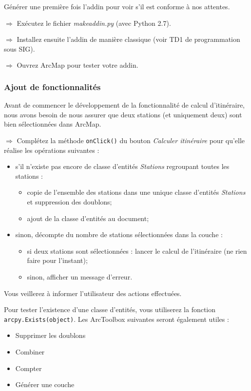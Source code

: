 \documentclass[11pt]{article}
\newcommand{\action}{$\Rightarrow$ }
\newcommand{\code}[1]{\lstinline{#1}}
\begin{document}
Générer une première fois l'addin pour voir s'il est conforme à nos attentes.

\action Exécutez le fichier \textit{makeaddin.py} (avec Python 2.7).

\action Installez ensuite l'addin de manière classique (voir TD1 de programmation sous SIG).

\action Ouvrez ArcMap pour tester votre addin.


\subsubsection{Ajout de fonctionnalités}
Avant de commencer le développement de la fonctionnalité de calcul d'itinéraire, nous avons besoin de nous assurer que deux stations (et uniquement deux) sont bien sélectionnées dans ArcMap.

\action Complétez la méthode \code{onClick()} du bouton \textit{Calculer itinéraire} pour qu'elle réalise les opérations suivantes :
\begin{itemize}
	\item s'il n'existe pas encore de classe d'entités \textit{Stations} regroupant toutes les stations :
	\begin{itemize}
		\item copie de l'ensemble des stations dans une unique classe d'entités \textit{Stations} et suppression des doublons;
		\item ajout de la classe d'entités au document;
	\end{itemize}
	\item sinon, décompte du nombre de stations sélectionnées dans la couche :
	\begin{itemize}
		\item si deux stations sont sélectionnées : lancer le calcul de l'itinéraire (ne rien faire pour l'instant);
		\item sinon, afficher un message d'erreur.
	\end{itemize}
\end{itemize}

Vous veillerez à informer l'utilisateur des actions effectuées.

Pour tester l'existence d'une classe d'entités, vous utiliserez la fonction \code{arcpy.Exists(object)}. Les ArcToolbox suivantes seront également utiles :
\begin{itemize}
	\item Supprimer les doublons
	\item Combiner
	\item Compter
	\item Générer une couche
\end{itemize}
\end{document}
